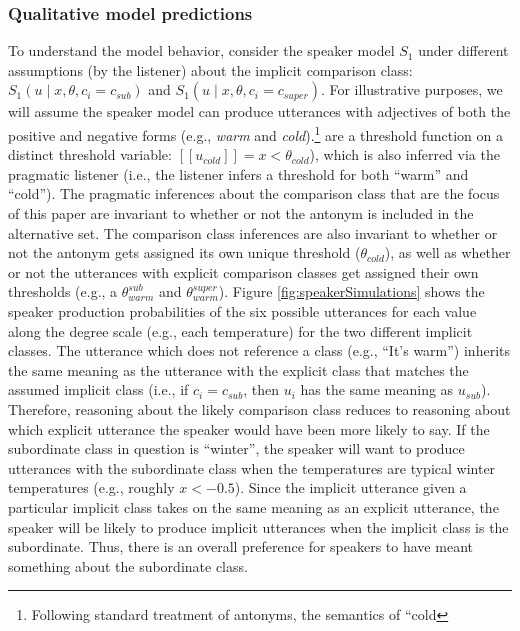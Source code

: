 \documentclass[doc]{apa6}
\begin{document}
\subsubsection{Qualitative model
predictions}

To understand the model behavior, consider the speaker model \(S_1\)
under different assumptions (by the listener) about the implicit
comparison class: \(S_{1}(u \mid x, \theta, c_i = c_{sub})\) and
\(S_{1}(u \mid x, \theta, c_i = c_{super})\). For illustrative purposes,
we will assume the speaker model can produce utterances with adjectives
of both the positive and negative forms (e.g., \emph{warm} and
\emph{cold}).\footnote{Following standard treatment of antonyms, the
  semantics of ``cold} are a threshold function on a distinct
  threshold variable: \([\![u_{cold}]\!] = x < \theta_{cold}\)), which
  is also inferred via the pragmatic listener (i.e., the listener infers
  a threshold for both ``warm'' and ``cold''). The pragmatic
  inferences about the comparison class that are the focus of this paper
  are invariant to whether or not the antonym is included in the
  alternative set. The comparison class inferences are also invariant to
  whether or not the antonym gets assigned its own unique threshold
  (\(\theta_{cold}\)), as well as whether or not the utterances with
  explicit comparison classes get assigned their own thresholds (e.g., a
  \(\theta_{warm}^{sub}\) and \(\theta_{warm}^{super}\)). Figure
\ref{fig:speakerSimulations} shows the speaker production probabilities
of the six possible utterances for each value along the degree scale
(e.g., each temperature) for the two different implicit classes. The
utterance which does not reference a class (e.g., ``It's warm'')
inherits the same meaning as the utterance with the explicit class that
matches the assumed implicit class (i.e., if \(c_{i} = c_{sub}\), then
\(u_i\) has the same meaning as \(u_{sub}\)). Therefore, reasoning about
the likely comparison class reduces to reasoning about which explicit
utterance the speaker would have been more likely to say. If the
subordinate class in question is ``winter'', the speaker will want
to produce utterances with the subordinate class when the temperatures
are typical winter temperatures (e.g., roughly \(x < -0.5\)). Since the
implicit utterance given a particular implicit class takes on the same
meaning as an explicit utterance, the speaker will be likely to produce
implicit utterances when the implicit class is the subordinate. Thus,
there is an overall preference for speakers to have meant something
about the subordinate class.
\end{document}
